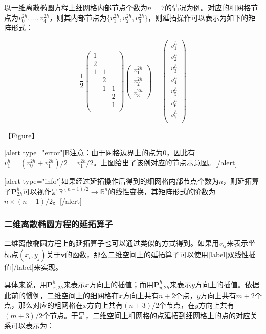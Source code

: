 \documentclass[12pt, UTF8, nofonts]{ctexart}
\begin{document}
以一维离散椭圆方程上细网格内部节点个数为$n=7$的情况为例。对应的粗网格节点为$v^{2h}_{0},\ldots,v^{2h}_{4}$，则其内部节点为$\{v^{2h}_{1},v^{2h}_{2},v^{2h}_{3}\}$，则延拓操作可以表示为如下的矩阵形式：

\[
  \dfrac{1}{2}
  \begin{pmatrix}
    1 & & \\ 2 & & \\ 1 & 1 & \\ & 2 & \\ & 1 & 1 \\ & & 2 \\ & & 1 \\
  \end{pmatrix}
  \begin{pmatrix}
    v^{2h}_{1} \\ v^{2h}_{2} \\ v^{2h}_{3}
  \end{pmatrix} =
  \begin{pmatrix}
    v^{h}_{1} \\ v^{h}_{2} \\ v^{h}_{3} \\ v^{h}_{4} \\ v^{h}_{5} \\
    v^{h}_{6} \\ v^{h}_{7} \\
  \end{pmatrix}
\]

【Figure】

[alert type="error"]B注意：由于网格边界上的点为$0$，因此有$v^{h}_{1}=(v^{2h}_{0}+v^{2h}_{1})/2=v^{2h}_{1}/2$。上图给出了该例对应的节点示意图。[/alert]

[alert type="info"]如果经过延拓操作后得到的细网格内部节点个数为$n$，则延拓算子$\boldsymbol{P}_{2h}^{h}$可以视作是$\mathbb{R}^{(n-1)/2}\to\mathbb{R}^{n}$的线性变换，其矩阵形式的阶数为$n \times (n-1)/2$。[/alert]

\subsubsection*{二维离散椭圆方程的延拓算子}

二维离散椭圆方程上的延拓算子也可以通过类似的方式得到。如果用$v_{ij}$来表示坐标点$(x_i,y_j)$关于$\boldsymbol{v}$的函数，那么二维空间上的延拓算子可以使用[label]双线性插值[/label]来实现。

具体来说，用$\boldsymbol{P}_{x,2h}^{h}$来表示$x$方向上的插值；而用$\boldsymbol{P}_{y,2h}^{h}$来表示$y$方向上的插值。依据此前的惯例，二维空间上的细网格在$x$方向上共有$n+2$个点，$y$方向上共有$m+2$个点，那么对应的粗网格在$x$方向上共有$(n+3)/2$个节点，在$y$方向上共有$(m+3)/2$个节点。于是，二维空间上粗网格的点延拓到细网格上的点的对应关系可以表示为：
\end{document}
